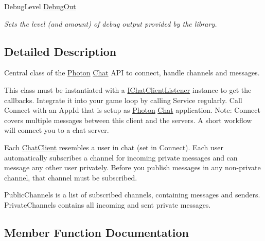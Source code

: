 \begin{DoxyCompactItemize}
Debug\+Level \hyperlink{class_exit_games_1_1_client_1_1_photon_1_1_chat_1_1_chat_client_a3506656c033fb2bdc7822275aab6dac2}{Debug\+Out}
\begin{DoxyCompactList}\small\item\em Sets the level (and amount) of debug output provided by the library. \end{DoxyCompactList}\end{DoxyCompactItemize}


\subsection{Detailed Description}
Central class of the \hyperlink{namespace_exit_games_1_1_client_1_1_photon}{Photon} \hyperlink{namespace_exit_games_1_1_client_1_1_photon_1_1_chat}{Chat} A\+PI to connect, handle channels and messages. 

This class must be instantiated with a \hyperlink{interface_exit_games_1_1_client_1_1_photon_1_1_chat_1_1_i_chat_client_listener}{I\+Chat\+Client\+Listener} instance to get the callbacks. Integrate it into your game loop by calling Service regularly. Call Connect with an App\+Id that is setup as \hyperlink{namespace_exit_games_1_1_client_1_1_photon}{Photon} \hyperlink{namespace_exit_games_1_1_client_1_1_photon_1_1_chat}{Chat} application. Note\+: Connect covers multiple messages between this client and the servers. A short workflow will connect you to a chat server.

Each \hyperlink{class_exit_games_1_1_client_1_1_photon_1_1_chat_1_1_chat_client}{Chat\+Client} resembles a user in chat (set in Connect). Each user automatically subscribes a channel for incoming private messages and can message any other user privately. Before you publish messages in any non-\/private channel, that channel must be subscribed.

Public\+Channels is a list of subscribed channels, containing messages and senders. Private\+Channels contains all incoming and sent private messages. 

\subsection{Member Function Documentation}
